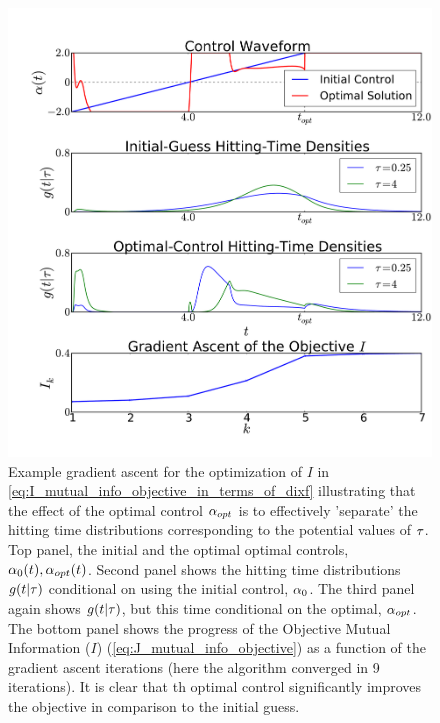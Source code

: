 \begin{figure}[htp] 
\begin{center}
\includegraphics[width=1\textwidth]{Figs/AdjointOptimizer/GradientAscent_Nt2.pdf}
  \caption[Gradient Ascent for the Optimal Stimulation]{Example gradient
  ascent for the optimization of $I$ in
  \cref{eq:I_mutual_info_objective_in_terms_of_dixf} illustrating that the
  effect of the optimal control $\alpha_{opt}$ is to effectively 'separate' the
  hitting time distributions corresponding to the potential values of ${ \tau }$.
  Top
  panel, the initial and the optimal optimal controls, $\alpha_{0}(t), \alpha_{opt}(t)$. Second panel shows the hitting time distributions $g(t|{ \tau })$ conditional on
  using the initial control, $\alpha_0$.
  The third panel again shows $g(t|{ \tau })$, but this time conditional on the
  optimal, $\alpha_{opt}$.
 The bottom panel shows the progress of the Objective Mutual Information ($I$) 
  (\cref{eq:J_mutual_info_objective}) as a function of the gradient ascent
  iterations (here the algorithm converged in 9 iterations). It is clear that
  th optimal control significantly improves the objective in comparison to the
  initial guess.}
  \label{fig:example_gradient_ascent}   
\end{center}   
\end{figure}    
 
